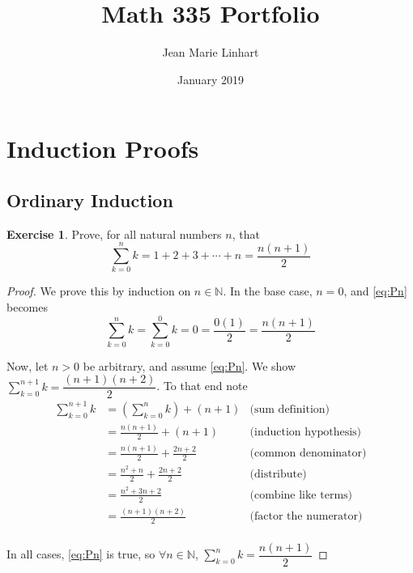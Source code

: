 \documentclass[12pt]{extarticle}
\title{Math 335 Portfolio}
\author{Jean Marie Linhart}
\date{January 2019}
\newcommand{\N}{\mathbb{N}}
\newcommand{\<}{\langle}
\renewcommand{\>}{\rangle}
\theoremstyle{definition}
\newtheorem{exercise}{Exercise}
\newcommand{\Disp}{\displaystyle}
\begin{document}
\maketitle

\section{Induction Proofs}
\subsection{Ordinary Induction}
\begin{exercise} Prove, for all natural numbers $n$, that 
\begin{equation} \sum_{k=0}^n k = 1 + 2 + 3 + \cdots + n = \dfrac{n(n+1)}{2}
\label{eq:Pn}\end{equation}
\end{exercise}

\begin{proof}
We prove this by induction on $n\in\N$.  In the base case, $n=0$, and \eqref{eq:Pn} becomes
$$\sum_{k=0}^n k = \sum_{k=0}^0 k = 0 = \dfrac{0(1)}{2} = \dfrac{n(n+1)}{2}$$

Now, let $n>0$ be arbitrary, and assume \eqref{eq:Pn}.
We show $\displaystyle \sum_{k=0}^{n+1} k = \dfrac{(n+1)(n+2)}{2}$.
To that end note 
\begin{align*}
	\sum_{k=0}^{n+1} k &= \left(\sum_{k=0}^{n} k\right) + (n+1) &\mbox{(sum definition)}\\
	&= \frac{n(n+1)}{2} + (n+1) &\mbox{(induction hypothesis)}
	\\
	&= \frac{n(n+1)}{2} + \frac{2n+2}{2} &\mbox{(common denominator)}
	\\
	&= \frac{n^2 +n}{2} + \frac{2n+2}{2} &\mbox{(distribute)}
	\\
	&= \frac{n^2 +3n + 2}{2} &\mbox{(combine like terms)}
	\\
	&= \frac{(n+1)(n+2)}{2} & \mbox{(factor the numerator)}\\
\end{align*}

In all cases, \eqref{eq:Pn} is true, so $\forall n\in \N$, 
$\Disp \sum_{k=0}^n k = \dfrac{n(n+1)}{2}$
\end{proof}
\end{document}

